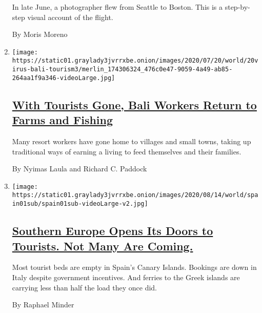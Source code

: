 \begin{enumerate}
  In late June, a photographer flew from Seattle to Boston. This is a
  step-by-step visual account of the flight.

  By Moris Moreno
\item
  \texttt{[image: https://static01.graylady3jvrrxbe.onion/images/2020/07/20/world/20virus-bali-tourism3/merlin\_174306324\_476c0e47-9059-4a49-ab85-264aa1f9a346-videoLarge.jpg]}

  \hypertarget{with-tourists-gone-bali-workers-return-to-farms-and-fishing}{%
  \subsection{\texorpdfstring{\href{/2020/07/20/world/asia/bali-tourism-coronavirus.html}{With
  Tourists Gone, Bali Workers Return to Farms and
  Fishing}}{With Tourists Gone, Bali Workers Return to Farms and Fishing}}\label{with-tourists-gone-bali-workers-return-to-farms-and-fishing}}

  Many resort workers have gone home to villages and small towns, taking
  up traditional ways of earning a living to feed themselves and their
  families.

  By Nyimas Laula and Richard C. Paddock
\item
  \texttt{[image: https://static01.graylady3jvrrxbe.onion/images/2020/08/14/world/spain01sub/spain01sub-videoLarge-v2.jpg]}

  \hypertarget{southern-europe-opens-its-doors-to-tourists-not-many-are-coming}{%
  \subsection{\texorpdfstring{\href{/2020/07/19/world/europe/tourism-virus-europe.html}{Southern
  Europe Opens Its Doors to Tourists. Not Many Are
  Coming.}}{Southern Europe Opens Its Doors to Tourists. Not Many Are Coming.}}\label{southern-europe-opens-its-doors-to-tourists-not-many-are-coming}}

  Most tourist beds are empty in Spain's Canary Islands. Bookings are
  down in Italy despite government incentives. And ferries to the Greek
  islands are carrying less than half the load they once did.

  By Raphael Minder
\end{enumerate}

